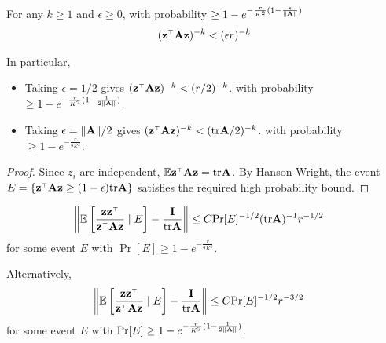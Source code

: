 \documentclass[11pt]{article}
\begin{document}
\begin{proposition}
  \label{prop:inv-moment-high-prob}
  For any $k \geq 1$ and $\epsilon \geq 0$,
  with probability $\geq 1 - e^{-\frac{r}{K^2} (1 - \frac{\epsilon}{\|\mathbf A\|})}$
  \begin{align*}
    (\z^\top \A \z)^{-k} < (\epsilon r)^{-k}
  \end{align*}

  In particular, 
  \begin{itemize}
    \item 
      Taking $\epsilon = 1/2$ gives
      $(\z^\top \A \z)^{-k} < (r / 2)^{-k}$.
      with probability $\geq 1 - e^{-\frac{r}{K^2}(1 - \frac{1}{2 \|\mathbf A\|})}$.
    \item 
      Taking $\epsilon = \|\mathbf A\|/2$ gives
      $(\z^\top \A \z)^{-k} < (\tr \A / 2)^{-k}$.
      with probability $\geq 1 - e^{-\frac{r}{2 K^2}}$.
  \end{itemize}
\end{proposition}


\begin{proof}
  Since $z_i$ are independent, $\E \z^\top \A \z = \tr \A$.
  By Hanson-Wright,
  the event $E = \{ \z^\top \A \z \geq (1 - \epsilon) \tr \A \}$
  satisfies the required high probability bound.
\end{proof}

\begin{lemma}
  \begin{align*}
    \left\| \E \left[
      \frac{\z \z^\top}{\z^\top \A \z}
      \mid E
    \right] - \frac{\I}{\tr \A} \right\|
    &\leq C \Pr[E]^{-1/2} (\tr \A)^{-1} r^{-1/2}
  \end{align*}
  for some event $E$ with $\Pr[E] \geq 1 - e^{-\frac{r}{2 K^2}}$.

  Alternatively,
  \begin{align*}
    \left\| \E \left[
      \frac{\z \z^\top}{\z^\top \A \z}
      \mid E
    \right] - \frac{\I}{\tr \A} \right\|
    &\leq C \Pr[E]^{-1/2} r^{-3/2}
  \end{align*}
  for some event $E$ with $\mathrm{Pr}[E] \geq 1 - e^{-\frac{r}{K^2} (1 - \frac{1}{2 \|\mathbf A\|})}$.
\end{lemma}
\end{document}

